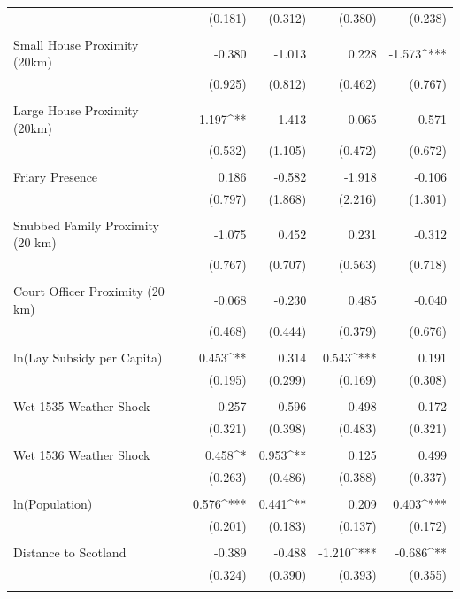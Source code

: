 \begin{table}[H]
\begin{tabular}{@{\extracolsep{.5pt}}lD{.}{.}{-3} D{.}{.}{-3} D{.}{.}{-3} D{.}{.}{-3} }
  & (0.181) & (0.312) & (0.380) & (0.238) \\ 
  & & & & \\ 
 Small House Proximity (20km) & -0.380 & -1.013 & 0.228 & -1.573^{***} \\ 
  & (0.925) & (0.812) & (0.462) & (0.767) \\ 
  & & & & \\ 
 Large House Proximity (20km) & 1.197^{**} & 1.413 & 0.065 & 0.571 \\ 
  & (0.532) & (1.105) & (0.472) & (0.672) \\ 
  & & & & \\ 
 Friary Presence & 0.186 & -0.582 & -1.918 & -0.106 \\ 
  & (0.797) & (1.868) & (2.216) & (1.301) \\ 
  & & & & \\ 
 Snubbed Family Proximity (20 km) & -1.075 & 0.452 & 0.231 & -0.312 \\ 
  & (0.767) & (0.707) & (0.563) & (0.718) \\ 
  & & & & \\ 
 Court Officer Proximity (20 km) & -0.068 & -0.230 & 0.485 & -0.040 \\ 
  & (0.468) & (0.444) & (0.379) & (0.676) \\ 
  & & & & \\ 
 ln(Lay Subsidy per Capita) & 0.453^{**} & 0.314 & 0.543^{***} & 0.191 \\ 
  & (0.195) & (0.299) & (0.169) & (0.308) \\ 
  & & & & \\ 
 Wet 1535 Weather Shock & -0.257 & -0.596 & 0.498 & -0.172 \\ 
  & (0.321) & (0.398) & (0.483) & (0.321) \\ 
  & & & & \\ 
 Wet 1536 Weather Shock & 0.458^{*} & 0.953^{**} & 0.125 & 0.499 \\ 
  & (0.263) & (0.486) & (0.388) & (0.337) \\ 
  & & & & \\ 
 ln(Population) & 0.576^{***} & 0.441^{**} & 0.209 & 0.403^{***} \\ 
  & (0.201) & (0.183) & (0.137) & (0.172) \\ 
  & & & & \\ 
 Distance to Scotland & -0.389 & -0.488 & -1.210^{***} & -0.686^{**} \\ 
  & (0.324) & (0.390) & (0.393) & (0.355) \\ 
  & & & & \\ 

\end{tabular}
\end{table}
